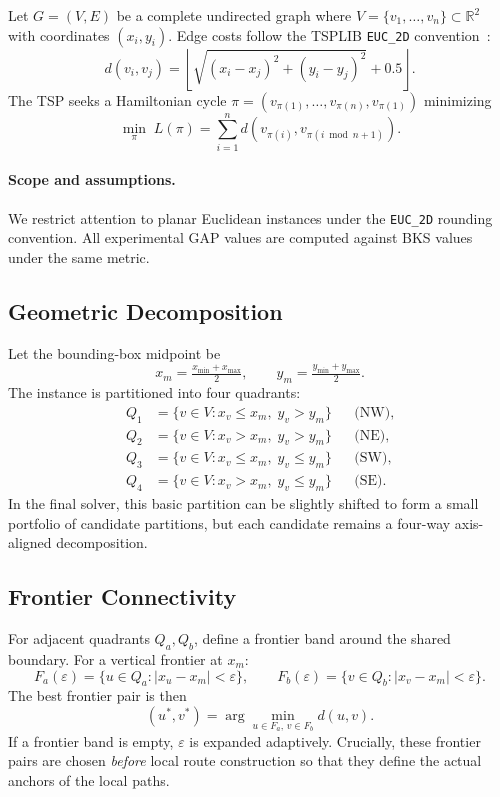 \documentclass[runningheads]{llncs}
\begin{document}
Let $G=(V,E)$ be a complete undirected graph where
$V=\{v_1,\dots,v_n\}\subset\mathbb{R}^2$ with coordinates
$(x_i,y_i)$. Edge costs follow the TSPLIB \texttt{EUC\_2D}
convention~\cite{reinelt1991tsplib}:
\begin{equation}
 d(v_i,v_j)=\left\lfloor\sqrt{(x_i-x_j)^2+(y_i-y_j)^2}+0.5\right\rfloor.
 \label{eq:dist}
\end{equation}
The TSP seeks a Hamiltonian cycle
$\pi=(v_{\pi(1)},\dots,v_{\pi(n)},v_{\pi(1)})$ minimizing
\begin{equation}
 \min_{\pi}\;L(\pi)=\sum_{i=1}^{n}
 d\!\left(v_{\pi(i)},v_{\pi(i\bmod n+1)}\right).
 \label{eq:tsp}
\end{equation}

\paragraph{Scope and assumptions.}
We restrict attention to planar Euclidean instances under the
\texttt{EUC\_2D} rounding convention. All experimental GAP values are
computed against BKS values under the same metric.

\subsection{Geometric Decomposition}

Let the bounding-box midpoint be
\begin{equation}
 x_m=\tfrac{x_{\min}+x_{\max}}{2}, \qquad
 y_m=\tfrac{y_{\min}+y_{\max}}{2}.
\end{equation}
The instance is partitioned into four quadrants:
\begin{align}
Q_1&=\{v\in V: x_v\le x_m,\; y_v>y_m\}  &&\text{(NW)},\\
Q_2&=\{v\in V: x_v>x_m,\; y_v>y_m\}    &&\text{(NE)},\\
Q_3&=\{v\in V: x_v\le x_m,\; y_v\le y_m\}&&\text{(SW)},\\
Q_4&=\{v\in V: x_v>x_m,\; y_v\le y_m\} &&\text{(SE)}.
\end{align}
In the final solver, this basic partition can be slightly shifted to
form a small portfolio of candidate partitions, but each candidate
remains a four-way axis-aligned decomposition.

\subsection{Frontier Connectivity}

For adjacent quadrants $Q_a,Q_b$, define a frontier band around the
shared boundary. For a vertical frontier at $x_m$:
\begin{equation}
F_a(\varepsilon)=\{u\in Q_a:|x_u-x_m|<\varepsilon\}, \qquad
F_b(\varepsilon)=\{v\in Q_b:|x_v-x_m|<\varepsilon\}.
\end{equation}
The best frontier pair is then
\begin{equation}
(u^*,v^*)=\arg\min_{u\in F_a,\,v\in F_b} d(u,v).
\label{eq:frontier}
\end{equation}
If a frontier band is empty, $\varepsilon$ is expanded adaptively.
Crucially, these frontier pairs are chosen \emph{before} local route
construction so that they define the actual anchors of the local paths.
\end{document}
